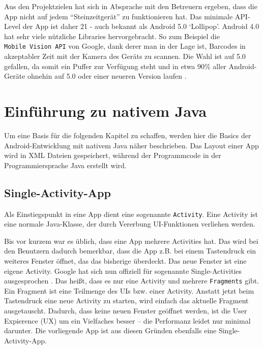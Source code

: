 Aus den Projektzielen hat sich in Absprache mit den Betreuern ergeben,
dass die App nicht auf jedem ``Steinzeitgerät'' zu funktionieren hat.
Das minimale API-Level der App ist daher 21 - auch bekannt als Android
5.0 `Lollipop'. Android 4.0 hat sehr viele nützliche Libraries
hervorgebracht. So zum Beispiel die \texttt{Mobile\ Vision\ API} von
Google, dank derer man in der Lage ist, Barcodes in akzeptabler Zeit mit
der Kamera des Geräts zu scannen. Die Wahl ist auf 5.0 gefallen, da
somit ein Puffer zur Verfügung steht und in etwa 90\% aller
Android-Geräte ohnehin auf 5.0 oder einer neueren Version laufen
\cite{android-versions-market-share}.

\hypertarget{einfuxfchrung-zu-nativem-java}{%
\section{Einführung zu nativem
Java}\label{einfuxfchrung-zu-nativem-java}}

Um eine Basis für die folgenden Kapitel zu schaffen, werden hier die
Basics der Android-Entwicklung mit nativem Java näher beschrieben. Das
Layout einer App wird in XML Dateien gespeichert, während der
Programmcode in der Programmiersprache Java erstellt wird.

\hypertarget{single-activity-app}{%
\subsection{Single-Activity-App}\label{single-activity-app}}

Als Einstiegspunkt in eine App dient eine sogenannte \texttt{Activity}.
Eine Activity ist eine normale Java-Klasse, der durch Vererbung
UI-Funktionen verliehen werden.

Bis vor kurzem war es üblich, dass eine App mehrere Activities hat. Das
wird bei den Benutzern dadurch bemerkbar, dass die App z.B. bei einem
Tastendruck ein weiteres Fenster öffnet, das das bisherige überdeckt.
Das neue Fenster ist eine eigene Activity. Google hat sich nun offiziell
für sogenannte Single-Activities ausgesprochen \cite{single-activity}.
Das heißt, dass es nur eine Activity und mehrere \texttt{Fragments}
gibt. Ein Fragment ist eine Teilmenge des UIs bzw. einer Activity.
Anstatt jetzt beim Tastendruck eine neue Activity zu starten, wird
einfach das aktuelle Fragment ausgetauscht. Dadurch, dass keine neuen
Fenster geöffnet werden, ist die User Expierence (UX) um ein Vielfaches
besser -- die Performanz leidet nur minimal darunter. Die vorliegende
App ist aus diesen Gründen ebenfalls eine Single-Activity-App.

